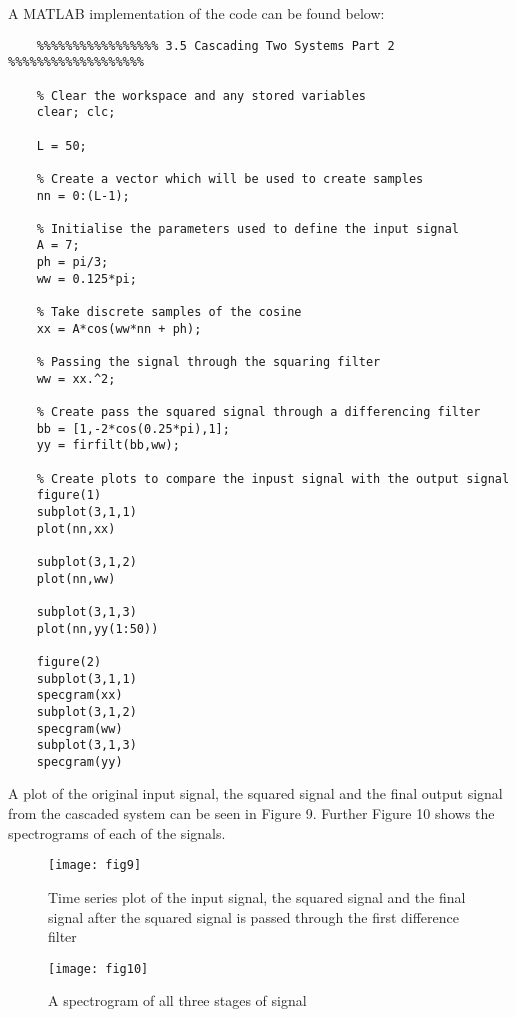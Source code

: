 \documentclass{article}
\begin{document}
A MATLAB implementation of the code can be found below:
\begin{lstlisting}
	%%%%%%%%%%%%%%%%% 3.5 Cascading Two Systems Part 2 %%%%%%%%%%%%%%%%%%%
	
	% Clear the workspace and any stored variables
	clear; clc;
	
	L = 50;
	
	% Create a vector which will be used to create samples
	nn = 0:(L-1);
	
	% Initialise the parameters used to define the input signal
	A = 7;
	ph = pi/3;
	ww = 0.125*pi;
	
	% Take discrete samples of the cosine
	xx = A*cos(ww*nn + ph);
	
	% Passing the signal through the squaring filter
	ww = xx.^2;
	
	% Create pass the squared signal through a differencing filter
	bb = [1,-2*cos(0.25*pi),1];
	yy = firfilt(bb,ww);
	
	% Create plots to compare the inpust signal with the output signal
	figure(1)
	subplot(3,1,1)
	plot(nn,xx)
	
	subplot(3,1,2)
	plot(nn,ww)
	
	subplot(3,1,3)
	plot(nn,yy(1:50))
	
	figure(2)
	subplot(3,1,1)
	specgram(xx)
	subplot(3,1,2)
	specgram(ww)
	subplot(3,1,3)
	specgram(yy)
\end{lstlisting}

A plot of the original input signal, the squared signal and the final output signal from the cascaded system can be seen in Figure 9. Further Figure 10 shows the spectrograms of each of the signals.

\begin{figure}[H]
	\centering
	\texttt{[image: fig9]}
	\caption{Time series plot of the input signal, the squared signal and the final signal after the squared signal is passed through the first difference filter}
\end{figure}

\begin{figure}[H]
	\centering
	\texttt{[image: fig10]}
	\caption{A spectrogram of all three stages of signal}
\end{figure}
\end{document}
